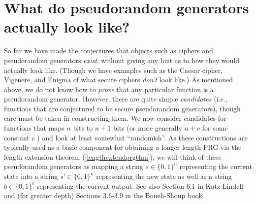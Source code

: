 \hypertarget{cointossingphonerm}{}

\section{What do pseudorandom generators actually look
like?}\label{3-What-do-pseudorandom-g}

So far we have made the conjectures that objects such as ciphers and
pseudorandom generators \emph{exist}, without giving any hint as to how
they would actually look like. (Though we have examples such as the
Caesar cipher, Vigenere, and Enigma of what secure ciphers \emph{don't}
look like.) As mentioned above, we do not know how to \emph{prove} that
any particular function is a pseudorandom generator. However, there are
quite simple \emph{candidates} (i.e., functions that are conjectured to
be secure pseudorandom generators), though care must be taken in
constructing them. We now consider candidates for functions that maps
\(n\) bits to \(n+1\) bits (or more generally \(n+c\) for some constant
\(c\) ) and look at least somewhat ``randomish''. As these constructions
are typically used as a basic component for obtaining a longer length
PRG via the length extension theorem (\cref{lengthextendprgthm}), we
will think of these pseudorandom generators as mapping a string
\(s\in\{0,1\}^n\) representing the current state into a string
\(s’\in\{0,1\}^n\) representing the new state as well as a string
\(b\in\{0,1\}^c\) representing the current output. See also Section 6.1
in Katz-Lindell and (for greater depth) Sections 3.6-3.9 in the
Boneh-Shoup book.

